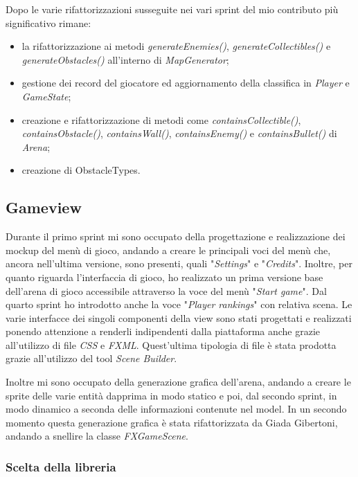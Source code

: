 Dopo le varie rifattorizzazioni susseguite nei vari sprint del mio contributo più significativo rimane:
\begin{itemize}
	\item la rifattorizzazione ai metodi \textit{generateEnemies()}, \textit{generateCollectibles()} e \textit{generateObstacles()} all'interno di \textit{MapGenerator};
	\item gestione dei record del giocatore ed aggiornamento della classifica in \textit{Player} e \textit{GameState};
	\item creazione e rifattorizzazione di metodi come \textit{containsCollectible()}, \textit{containsObstacle()}, \textit{containsWall()}, \textit{containsEnemy()} e \textit{containsBullet()} di \textit{Arena};
	\item creazione di ObstacleTypes.
\end{itemize}


\subsection{Gameview}
Durante il primo sprint mi sono occupato della progettazione e realizzazione dei mockup del menù di gioco, andando a creare le principali voci del menù che, ancora nell'ultima versione, sono presenti, quali "\textit{Settings}" e "\textit{Credits}".
Inoltre, per quanto riguarda l'interfaccia di gioco, ho realizzato un prima versione base dell'arena di gioco accessibile attraverso la voce del menù "\textit{Start game}".
Dal quarto sprint ho introdotto anche la voce "\textit{Player rankings}" con relativa scena.
Le varie interfacce dei singoli componenti della view sono stati progettati e realizzati ponendo attenzione a renderli indipendenti dalla piattaforma anche grazie all'utilizzo di file \textit{CSS} e \textit{FXML}.
Quest'ultima tipologia di file è stata prodotta grazie all'utilizzo del tool \textit{Scene Builder}.

Inoltre mi sono occupato della generazione grafica dell'arena, andando a creare le sprite delle varie entità dapprima in modo statico e poi, dal secondo sprint, in modo dinamico a seconda delle informazioni contenute nel model.
In un secondo momento questa generazione grafica è stata rifattorizzata da Giada Gibertoni, andando a snellire la classe \textit{FXGameScene}.

\subsubsection{Scelta della libreria}

